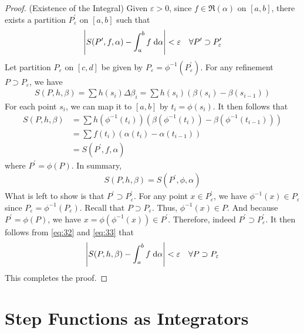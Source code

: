 \documentclass[thmcnt=section, 12pt]{my-elegantbook}
\begin{document}
\begin{proof}
    \par (Existence of the Integral) Given $\varepsilon > 0$, since $f \in \mathfrak{R}(\alpha)$ on $[a, b]$, there exists a partition $P^\prime_\varepsilon$ on $[a, b]$ such that 
    \begin{align}
        \left\lvert S(P^\prime, f, \alpha) - \int_a^b f \; \mathrm{d}\alpha \right\rvert < \varepsilon
        \quad \forall P^\prime \supset P^\prime_\varepsilon
        \label{eq:32}
    \end{align}
    Let partition $P_\varepsilon$ on $[c, d]$ be given by $P_\varepsilon = \phi^{-1}(P^\prime_\varepsilon)$. For any refinement $P \supset P_\varepsilon$, we have 
    \begin{align*}
        S(P, h, \beta)
        = \sum h(s_i) \Delta\beta_i
        = \sum h(s_i) (\beta(s_i) - \beta(s_{i-1}))
    \end{align*}
    For each point $s_i$, we can map it to $[a, b]$ by $t_i = \phi(s_i)$. It then follows that 
    \begin{align*}
        S(P, h, \beta)
        &= \sum h(\phi^{-1}(t_i)) (\beta(\phi^{-1}(t_i)) - \beta(\phi^{-1}(t_{i-1}))) \\ 
        &= \sum f(t_i) (\alpha(t_i) - \alpha(t_{i-1})) \\ 
        &= S(P^\prime, f, \alpha)
    \end{align*}
    where $P^\prime = \phi(P)$. In summary,
    \begin{align}
        S(P, h, \beta) = S(P^\prime, \phi, \alpha)
        \label{eq:33}
    \end{align}
    What is left to show is that $P^\prime \supset P^\prime_\varepsilon$. For any point $x \in P^\prime_\varepsilon$, we have $\phi^{-1}(x) \in P_\varepsilon$ since $P_\varepsilon = \phi^{-1}(P_\varepsilon)$. Recall that $P \supset P_\varepsilon$. Thus, $\phi^{-1}(x) \in P$. And because $P^\prime = \phi(P)$, we have $x = \phi(\phi^{-1}(x)) \in P^\prime$. Therefore, indeed $P^\prime \supset P^\prime_\varepsilon$. It then follows from \eqref{eq:32} and \eqref{eq:33} that 
    \begin{align*}
        \left\lvert S(P, h, \beta) - \int_a^b f \; \mathrm{d}\alpha \right\rvert < \varepsilon
        \quad \forall P \supset P_\varepsilon
    \end{align*}
    This completes the proof.
\end{proof}


\section{Step Functions as Integrators}
\end{document}
